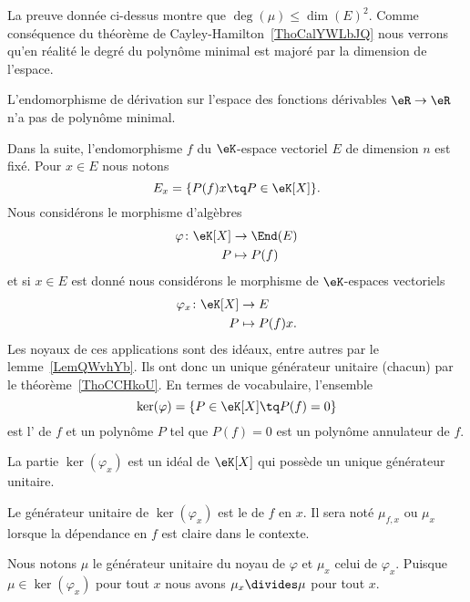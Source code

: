 \begin{remark}
	La preuve donnée ci-dessus montre que \( \deg(\mu)\leq \dim(E)^2\). Comme conséquence du théorème de Cayley-Hamilton~\ref{ThoCalYWLbJQ} nous verrons qu'en réalité le degré du polynôme minimal est majoré par la dimension de l'espace.
\end{remark}

\begin{proposition}        \label{PROPooZCUSooLUUrxi}
	L'endomorphisme de dérivation sur l'espace des fonctions dérivables \( \eR\to \eR\) n'a pas de polynôme minimal.
\end{proposition}

Dans la suite, l'endomorphisme \( f\) du \( \eK\)-espace vectoriel \( E\) de dimension \( n\) est fixé. Pour \( x\in E\) nous notons
\begin{equation}            \label{EqooOAYDooEpZELo}
	E_x=\{ P(f)x\tq P\in \eK[X] \}.
\end{equation}
Nous considérons le morphisme d'algèbres
\begin{equation}
	\begin{aligned}
		\varphi\colon \eK[X] & \to \End(E)  \\
		P                    & \mapsto P(f)
	\end{aligned}
\end{equation}
et si \( x\in E\) est donné nous considérons le morphisme de \( \eK\)-espaces vectoriels
\begin{equation}
	\begin{aligned}
		\varphi_x\colon \eK[X] & \to E          \\
		P                      & \mapsto P(f)x.
	\end{aligned}
\end{equation}
Les noyaux de ces applications sont des idéaux, entre autres par le lemme~\ref{LemQWvhYb}. Ils ont donc un unique générateur unitaire (chacun) par le théorème~\ref{ThoCCHkoU}. En termes de vocabulaire, l'ensemble
\begin{equation}
	\ker(\varphi)=\{  P\in\eK[X]\tq P(f)=0  \}
\end{equation}
est l' de \( f\) et un polynôme \( P\) tel que \( P(f)=0\) est un polynôme annulateur de \( f\).

\begin{propositionDef}      \label{DEFooUICRooBGYhqQ}
	La partie \( \ker(\varphi_x)\) est un idéal de \( \eK[X]\) qui possède un unique générateur unitaire.

	Le générateur unitaire de \( \ker(\varphi_x)\) est le  de \( f\) en \( x\). Il sera noté \( \mu_{f,x}\) ou \( \mu_x\) lorsque la dépendance en \( f\) est claire dans le contexte.
\end{propositionDef}
Nous notons \( \mu\) le générateur unitaire du noyau de \( \varphi\) et \( \mu_x\) celui de \( \varphi_x\). Puisque \( \mu\in\ker(\varphi_x)\) pour tout \( x\) nous avons \( \mu_x\divides \mu\) pour tout \( x\).

